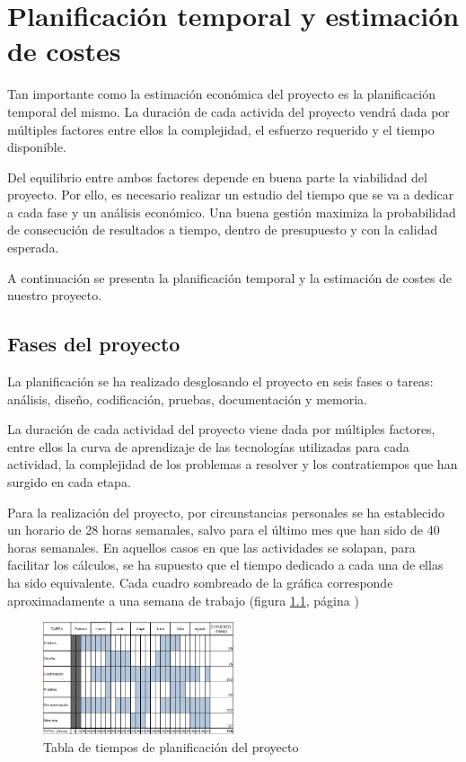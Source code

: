 \chapter{Planificación temporal y estimación de costes}
\label{chap:planificacion}

Tan importante como la estimación económica del proyecto es la planificación temporal del mismo. La duración de cada activida del proyecto vendrá dada por múltiples factores entre ellos la complejidad, el esfuerzo requerido y el tiempo disponible.

Del equilibrio entre ambos factores depende en buena parte la viabilidad del
proyecto. Por ello, es necesario realizar un estudio del tiempo que se va a dedicar a cada fase y un análisis económico. Una buena gestión maximiza la probabilidad de consecución de resultados a tiempo, dentro de presupuesto y con la calidad esperada.

A continuación se presenta la planificación temporal y la estimación de costes de nuestro proyecto.

\section{Fases del proyecto} 

La planificación se ha realizado desglosando el proyecto en seis fases o tareas: análisis, diseño, codificación, pruebas, documentación y memoria. 

La duración de cada actividad del proyecto viene dada por múltiples factores, entre ellos la curva de aprendizaje de las tecnologías utilizadas para cada actividad, la complejidad de los problemas a resolver y los contratiempos que han surgido en cada etapa.

Para la realización del proyecto, por circunstancias personales se ha establecido un horario de 28 horas semanales, salvo para el último mes que han sido de 40 horas semanales. En aquellos casos en que las actividades se solapan, para facilitar los cálculos, se ha supuesto que el tiempo dedicado a cada una de ellas ha sido equivalente. Cada cuadro sombreado de la gráfica corresponde aproximadamente a una semana de trabajo (figura \ref{fig:planificacion}, página \pageref{fig:planificacion})


\begin{figure}[H]
  \centering
  \includegraphics[width=0.50\textwidth]{imaxes/planificacion.png}
  \caption{Tabla de tiempos de planificación del proyecto}
  \label{fig:planificacion}
\end{figure}


